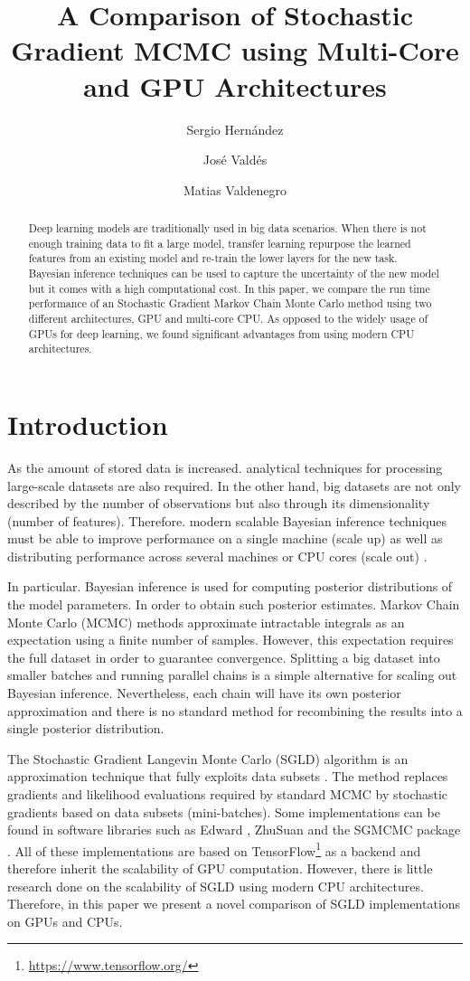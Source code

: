 \documentclass[9pt,lineno]{crone}
\title{A Comparison of Stochastic Gradient MCMC using Multi-Core and GPU Architectures}
\author[*1,2]{Sergio Hern\'andez}
\author[1]{Jos\'e Vald\'es}
\author[3]{Matias Valdenegro}
\affil[1]{Laboratorio de Procesamiento de Informaci\'on Geoespacial.}
\affil[2]{Centro de Innovaci\'on en Ingenier\'ia Aplicada, Universidad Cat\'olica del Maule. Chile}
\affil[3]{German Research Center for Artificial Intelligence, Robotics Innovation Center. Germany}
\begin{document}
\maketitle

\begin{abstract}
Deep learning models are traditionally used in big data scenarios. When there is not enough training data to fit a large model, transfer learning repurpose the learned features from an existing model and re-train the lower layers for the new task. Bayesian inference techniques can be used to capture the uncertainty of the new model but it comes with a high computational cost. In this paper, we compare the run time performance of an Stochastic Gradient Markov Chain Monte Carlo method using two different architectures, GPU and multi-core CPU. As opposed to the widely usage of GPUs for deep learning, we found significant advantages from using modern CPU architectures.
\end{abstract}

\section{Introduction}
As the amount of stored data is increased. analytical techniques for processing large-scale datasets are also required. In the other hand, big datasets are not only described by the number of observations but also through its dimensionality (number of features). Therefore. modern scalable Bayesian inference techniques must be able to improve performance on a single machine (scale up) as well as distributing performance across several machines or CPU cores (scale out) \cite{angelino2016patterns}.

In particular. Bayesian inference is used for computing posterior distributions of the model parameters. In order to obtain such posterior estimates. Markov Chain Monte Carlo (MCMC) methods approximate intractable integrals as an expectation using a finite number of samples. However, this expectation requires the full dataset in order to guarantee convergence.  Splitting a big dataset into smaller batches and running parallel chains is a simple alternative for scaling out Bayesian inference. Nevertheless, each chain will have its own posterior approximation and there is no standard method for recombining the results into a single posterior distribution. 

The Stochastic Gradient Langevin Monte Carlo (SGLD) algorithm is an approximation technique that fully exploits data subsets \cite{welling2011bayesian}. The method replaces gradients and likelihood evaluations required by standard MCMC by stochastic gradients based on data subsets (mini-batches). Some implementations can be found in software libraries such as Edward \cite{Tran2018}, ZhuSuan \cite{zhusuan2017} and the SGMCMC package \cite{baker2017sgmcmc}. All of these implementations are based on TensorFlow\footnote{\url{https://www.tensorflow.org/}} as a backend and therefore inherit the scalability of GPU computation. However, there is little research done on the scalability of SGLD using modern CPU architectures. Therefore, in this paper we present a novel comparison of SGLD implementations on GPUs and CPUs. 
% 
\end{document}
